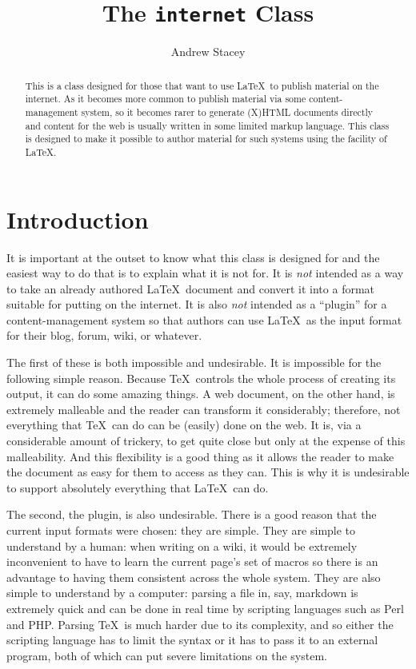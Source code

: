 \documentclass[%
  use filename,
  markdownextra={section level=2}
]{internet}
\title{The \texttt{internet} Class}
\author{Andrew Stacey}
\begin{document}
\maketitle

\begin{abstract}
This is a class designed for those that want to use \LaTeX\ to publish material on the internet.
As it becomes more common to publish material via some content-management system, so it becomes rarer to generate (X)HTML documents directly and content for the web is usually written in some limited markup language.
This class is designed to make it possible to author material for such systems using the facility of \LaTeX.
\end{abstract}

\section{Introduction}

It is important at the outset to know what this class is designed for and the easiest way to do that is to explain what it is not for.
It is \emph{not} intended as a way to take an already authored \LaTeX\ document and convert it into a format suitable for putting on the internet.
It is also \emph{not} intended as a ``plugin'' for a content-management system so that authors can use \LaTeX\ as the input format for their blog, forum, wiki, or whatever.

The first of these is both impossible and undesirable.
It is impossible for the following simple reason.
Because \TeX\ controls the whole process of creating its output, it can do some amazing things.
A web document, on the other hand, is extremely malleable and the reader can transform it considerably; therefore, not everything that \TeX\ can do can be (easily) done on the web.
It is, via a considerable amount of trickery, to get quite close but only at the expense of this malleability.
And this flexibility is a good thing as it allows the reader to make the document as easy for them to access as they can.
This is why it is undesirable to support absolutely everything that \LaTeX\ can do.

The second, the plugin, is also undesirable.
There is a good reason that the current input formats were chosen: they are simple.
They are simple to understand by a human: when writing on a wiki, it would be extremely inconvenient to have to learn the current page's set of macros so there is an advantage to having them consistent across the whole system.
They are also simple to understand by a computer: parsing a file in, say, markdown is extremely quick and can be done in real time by scripting languages such as Perl and PHP.
Parsing \TeX\ is much harder due to its complexity, and so either the scripting language has to limit the syntax or it has to pass it to an external program, both of which can put severe limitations on the system.
\end{document}
